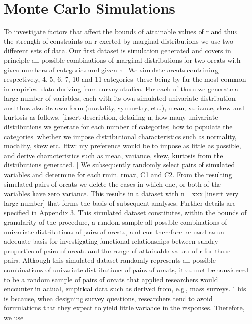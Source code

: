 \documentclass[
  12pt,
]{article}
\theoremstyle{plain}
\theoremstyle{definition}
\theoremstyle{remark}
\begin{document}
\section{Monte Carlo Simulations}\label{sec-MCsim}

To investigate factors that affect the bounds of attainable values of r
and thus the strength of constraints on r exerted by marginal
distributions we use two different sets of data. Our first dataset is
simulation generated and covers in principle all possible combinations
of marginal distributions for two orcats with given numbers of
categories and given n.~We simulate orcats containing, respectively, 4,
5, 6, 7, 10 and 11 categories, these being by far the most common in
empirical data deriving from survey studies. For each of these we
generate a large number of variables, each with its own simulated
univariate distribution, and thus also its own form (modality, symmetry,
etc.), mean, variance, skew and kurtosis as follows. {[}insert
description, detailing n, how many univariate distributions we generate
for each number of categories; how to populate the categories, whether
we impose distributional characteristics such as normality, modality,
skew etc. Btw: my preference would be to impose as little as possible,
and derive characteristics such as mean, variance, skew, kurtosis from
the distributions generated. {]} We subsequently randomly select pairs
of simulated variables and determine for each rmin, rmax, C1 and C2.
From the resulting simulated pairs of orcats we delete the cases in
which one, or both of the variables have zero variance. This results in
a dataset with n= xxx {[}insert very large number{]} that forms the
basis of subsequent analyses. Further details are specified in Appendix
3. This simulated dataset constitutes, within the bounds of granularity
of the procedure, a random sample all possible combinations of
univariate distributions of pairs of orcats, and can therefore be used
as an adequate basis for investigating functional relationships between
sundry properties of pairs of orcats and the range of attainable values
of r for those pairs. Although this simulated dataset randomly
represents all possible combinations of univariate distributions of
pairs of orcats, it cannot be considered to be a random sample of pairs
of orcats that applied researchers would encounter in actual, empirical
data such as derived from, e.g., mass surveys. This is because, when
designing survey questions, researchers tend to avoid formulations that
they expect to yield little variance in the responses. Therefore, we use
\end{document}
